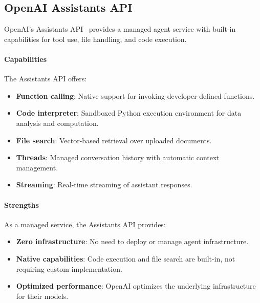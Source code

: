 \subsection{OpenAI Assistants API}

OpenAI's Assistants API~%
provides a managed agent service with built-in capabilities for tool use, file handling, and code execution.

\paragraph{Capabilities}
The Assistants API offers:
\begin{itemize}
    \item \textbf{Function calling}: Native support for invoking developer-defined functions.
    \item \textbf{Code interpreter}: Sandboxed Python execution environment for data analysis and computation.
    \item \textbf{File search}: Vector-based retrieval over uploaded documents.
    \item \textbf{Threads}: Managed conversation history with automatic context management.
    \item \textbf{Streaming}: Real-time streaming of assistant responses.
\end{itemize}

\paragraph{Strengths}
As a managed service, the Assistants API provides:
\begin{itemize}
    \item \textbf{Zero infrastructure}: No need to deploy or manage agent infrastructure.
    \item \textbf{Native capabilities}: Code execution and file search are built-in, not requiring custom implementation.
    \item \textbf{Optimized performance}: OpenAI optimizes the underlying infrastructure for their models.
\end{itemize}

